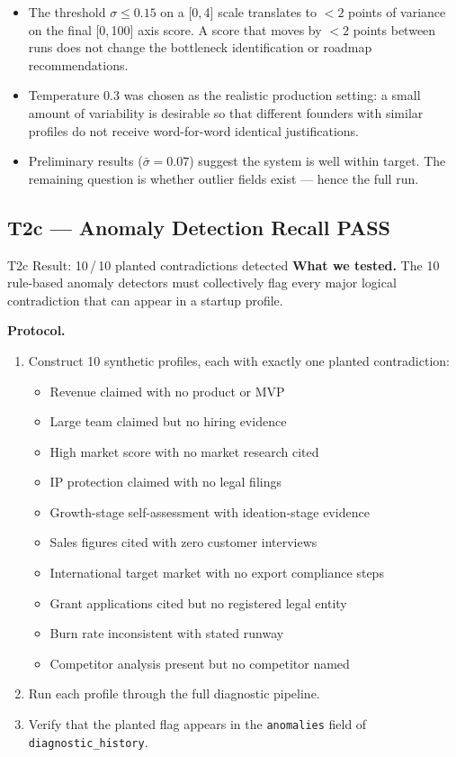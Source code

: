 \documentclass[11pt,a4paper]{article}
\newcommand{\ppass}{\colorbox{PassBg}{\small\textbf{PASS}}}
\begin{document}
\begin{itemize}
  \item The threshold $\sigma \leq 0.15$ on a [0,\,4] scale translates to $<2$ points of
        variance on the final [0,\,100] axis score. A score that moves by $<2$ points
        between runs does not change the bottleneck identification or roadmap recommendations.
  \item Temperature 0.3 was chosen as the realistic production setting: a small amount of
        variability is desirable so that different founders with similar profiles do not
        receive word-for-word identical justifications.
  \item Preliminary results ($\bar{\sigma} = 0.07$) suggest the system is well within
        target. The remaining question is whether outlier fields exist — hence the full run.
\end{itemize}

\subsection{T2c — Anomaly Detection Recall \ppass}

\begin{passbox}{T2c Result: 10\,/\,10 planted contradictions detected}
\textbf{What we tested.}
The 10 rule-based anomaly detectors must collectively flag every major logical
contradiction that can appear in a startup profile.

\textbf{Protocol.}
\begin{enumerate}
  \item Construct 10 synthetic profiles, each with exactly one planted contradiction:
  \begin{itemize}
    \item Revenue claimed with no product or MVP
    \item Large team claimed but no hiring evidence
    \item High market score with no market research cited
    \item IP protection claimed with no legal filings
    \item Growth-stage self-assessment with ideation-stage evidence
    \item Sales figures cited with zero customer interviews
    \item International target market with no export compliance steps
    \item Grant applications cited but no registered legal entity
    \item Burn rate inconsistent with stated runway
    \item Competitor analysis present but no competitor named
  \end{itemize}
  \item Run each profile through the full diagnostic pipeline.
  \item Verify that the planted flag appears in the \texttt{anomalies} field of
        \texttt{diagnostic\_history}.
\end{enumerate}
\end{passbox}
\end{document}
